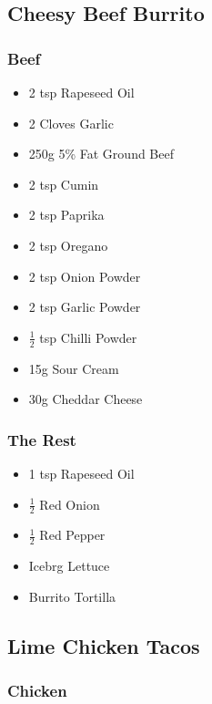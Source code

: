 \documentclass[11pt, english]{article}
\begin{document}
\newpage

	\subsection{Cheesy Beef Burrito}

		\subsubsection*{Beef}

	\begin{itemize}
        \setlength\itemsep{0cm}
                \item 2 tsp Rapeseed Oil
		\item 2 Cloves Garlic
		\item 250g 5\% Fat Ground Beef
		\item 2 tsp Cumin
		\item 2 tsp Paprika
		\item 2 tsp Oregano
		\item 2 tsp Onion Powder
		\item 2 tsp Garlic Powder
		\item $\frac{1}{2}$ tsp Chilli Powder
		\item 15g Sour Cream
		\item 30g Cheddar Cheese
        \end{itemize}

		\subsubsection*{The Rest}

	\begin{itemize}
        \setlength\itemsep{0cm}
                \item 1 tsp Rapeseed Oil
		\item $\frac{1}{2}$ Red Onion
		\item $\frac{1}{2}$ Red Pepper
		\item Icebrg Lettuce
		\item Burrito Tortilla
        \end{itemize}

\newpage

	\subsection{Lime Chicken Tacos}

		\subsubsection*{Chicken}
\end{document}
